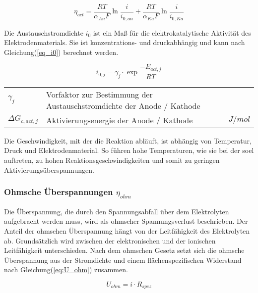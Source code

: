 \documentclass[onecolumn,10pt,titlepage]{article}
\begin{document}
			\begin{equation}
				\eta_{act}=\frac{RT}{\alpha_{An}F}\ln{\frac{i}{i_{0,an}}}+\frac{RT}{\alpha_{Ka}F}\ln{\frac{i}{i_{0,Ka}}}
				\label{eq:buttVoll_Umst}
			\end{equation}


			Die Austauschstromdichte $i_0$ ist ein Maß für die elektrokatalytische Aktivität des Elektrodenmaterials. Sie ist konzentrations- und druckabhängig und kann nach Gleichung(\ref{eq_i0}) berechnet werden.\cite{NI.2007}

			\begin{equation}
				i_{0,j}= \gamma_j\cdot \exp{\frac{-E_{act,j}}{RT}}
				\label{eq_i0}
			\end{equation}

			\begin{table}[H]
				\begin{tabular*}{\textwidth}{lll}
					$\gamma_j$&Vorfaktor zur Bestimmung der Austauschstromdichte der Anode / Kathode&\\
					$\Delta G_{c,act,j}$&Aktivierungsenergie der Anode / Kathode&$J/mol$\\
				\end{tabular*}
			\end{table}

			Die Geschwindigkeit, mit der die Reaktion abläuft, ist abhängig von Temperatur, Druck und Elektrodenmaterial. So führen hohe Temperaturen, wie sie bei der \gls{soel} auftreten, zu hohen Reaktionsgeschwindigkeiten und somit zu geringen Aktivierungsüberspannungen.

			\subsubsection*{Ohmsche Überspannungen $\eta_{ohm}$}
			Die Überspannung, die durch den Spannungsabfall über dem Elektrolyten aufgebracht werden muss, wird als ohmscher Spannungsverlust beschrieben.\cite{Klein.2013} Der Anteil der ohmschen Überspannung hängt von der Leitfähigkeit des Elektrolyten ab. Grundsätzlich wird zwischen der elektronischen und der ionischen Leitfähigkeit unterschieden. Nach dem ohmschen Gesetz setzt sich die ohmsche Überspannung aus der Stromdichte und einem flächenspezifischen Widerstand nach Gleichung(\ref{eq:U_ohm}) zusammen.\cite{Goetz.2000}

			\begin{equation}
			U_{ohm}=i\cdot R_{spez}
			\label{eq:U_ohm}
			\end{equation}
\end{document}
